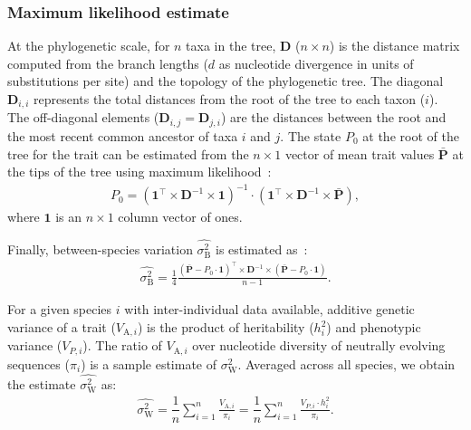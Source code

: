 \documentclass{article}
\newcommand{\Multiply}{\cdot}
\newcommand{\MultiplyMatrix}{\times}
\newcommand{\UniDimArray}[1]{\bm{#1}}
\newcommand{\BiDimArray}[1]{\bm{#1}}
\newcommand{\tr}{^{\intercal}}
\newcommand{\inv}{^{-1}}
\newcommand{\Spi}{i}
\newcommand{\Spj}{j}
\newcommand{\NbrTaxa}{n}
\newcommand{\Trait}{P}
\newcommand{\Heritability}{h^2}
\newcommand{\VecTrait}{\UniDimArray{\bar{\Trait}}}
\newcommand{\Root}{0}
\newcommand{\RootTrait}{\Trait_{\Root}}
\newcommand{\VecOne}{\UniDimArray{1}}
\newcommand{\Distance}{\BiDimArray{D}}
\newcommand{\DistanceMatrix}{\BiDimArray{\Distance}}
\newcommand{\VarGeneticSpi}{V_{\mathrm{A}, \Spi}}
\newcommand{\RateBetween}{\sigma^2_{\mathrm{B}}}
\newcommand{\RateWhithin}{\sigma^2_{\mathrm{W}}}
\newcommand{\EstRateBetween}{\widehat{\RateBetween}}
\newcommand{\EstRateWhithin}{\widehat{\RateWhithin}}
\begin{document}
\subsubsection*{Maximum likelihood estimate}
At the phylogenetic scale, for $\NbrTaxa$ taxa in the tree, $\DistanceMatrix$ ($\NbrTaxa \times \NbrTaxa$) is the distance matrix computed from the branch lengths ($d$ as nucleotide divergence in units of substitutions per site) and the topology of the phylogenetic tree.
The diagonal $\Distance_{\Spi,\Spi}$ represents the total distances from the root of the tree to each taxon ($\Spi$).
The off-diagonal elements ($\Distance_{\Spi,\Spj} = \Distance_{\Spj,\Spi}$) are the distances between the root and the most recent common ancestor of taxa $\Spi$ and $\Spj$.
The state $\RootTrait$ at the root of the tree for the trait can be estimated from the $\NbrTaxa \times 1$ vector of mean trait values $\VecTrait$ at the tips of the tree using maximum likelihood~\parencite{omeara_testing_2006}:
\begin{gather}
    \RootTrait = \left( \VecOne\tr \MultiplyMatrix \DistanceMatrix\inv \MultiplyMatrix \VecOne \right)\inv \Multiply \left( \VecOne\tr \MultiplyMatrix \DistanceMatrix\inv \MultiplyMatrix \VecTrait \right), \label{eq:estimated-root-trait}
\end{gather}
where $\VecOne$ is an $\NbrTaxa \times 1$ column vector of ones.

Finally, between-species variation $\EstRateBetween$ is estimated as~\parencite{omeara_testing_2006}:
\begin{gather}
    \EstRateBetween = \frac{1}{4}\frac{\left( \VecTrait -  \RootTrait \Multiply \VecOne \right)\tr \MultiplyMatrix \DistanceMatrix\inv \MultiplyMatrix \left( \VecTrait -  \RootTrait \Multiply \VecOne  \right)}{\NbrTaxa - 1}. \label{eq:estimated-rate-phy}
\end{gather}

For a given species $\Spi$ with inter-individual data available, additive genetic variance of a trait ($\VarGeneticSpi$) is the product of heritability ($\Heritability_{i}$) and phenotypic variance ($V_{\Trait, i}$).
The ratio of $\VarGeneticSpi$ over nucleotide diversity of neutrally evolving sequences ($\pi_{\Spi}$) is a sample estimate of $\RateWhithin$.
Averaged across all species, we obtain the estimate $\EstRateWhithin$ as:
\begin{gather}
    \EstRateWhithin = \dfrac{1}{\NbrTaxa}\sum_{i=1}^{\NbrTaxa}\frac{  \VarGeneticSpi}{ \pi_{i}} = \dfrac{1}{\NbrTaxa}\sum_{i=1}^{\NbrTaxa} \frac{  V_{\Trait, i} \Multiply \Heritability_{i}}{ \pi_{i}}. \label{eq:estimated-rate-pop}
\end{gather}
\end{document}
